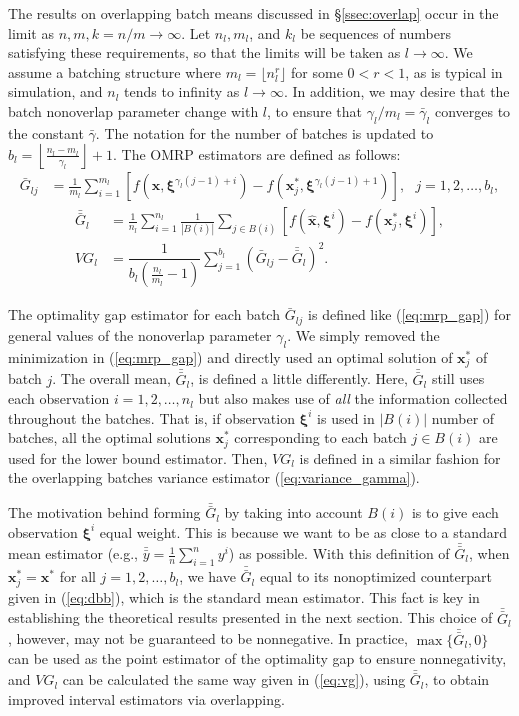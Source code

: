 \documentclass[12pt]{article}
\newcommand{\x}{\mathbf{x}}
\newcommand{\xh}{{\hat{\x}}}
\newcommand{\xs}{\x^*}
\newcommand{\xit}{\boldsymbol{\xi}}
\newcommand{\xiti}{\xit^i}
\newcommand{\nbl}{b_l}
\newcommand{\gammab}{\bar{\gamma}}
\newcommand{\gb}{\bar{G}}
\newcommand{\gbb}{\bar{\gb}}
\newcommand{\yb}{\bar{y}}
\newcommand{\ybb}{\bar{\yb}}
\begin{document}
The results on overlapping batch means discussed in \S \ref{ssec:overlap} occur in the limit as $n, m, k=n/m \rightarrow \infty$.  
Let $n_l, m_l$, and $k_l$ be sequences of numbers satisfying these requirements, so that the limits will be taken as $l \rightarrow \infty$.  
We assume a batching structure where $m_l = \lfloor n_l ^r \rfloor$ for some $0<r<1$, as is typical in simulation, and $n_l$ tends to infinity as $l \rightarrow \infty$.  
In addition, we may desire that the batch nonoverlap parameter change with $l$, to ensure that $\gamma_l / m_l = \gammab_l$ converges to the constant $\gammab$.  
The notation for the number of batches is updated to $b_l = \left\lfloor\tfrac{n_l-m_l}{\gamma_l}\right\rfloor+1$.
The OMRP estimators are defined as follows:
\begin{align}
	\gb_{lj} & = \frac{1}{m_l} \sum_{i=1}^{m_l} \left[ f(\xh,\xit^{\gamma_l(j-1)+i}) - f(\xs_j,\xit^{\gamma_l(j-1)+1}) \right],\ \ \ j = 1, 2, \dots, \nbl, \label{eq:gbar} 
\end{align}
\begin{align}
	\gbb_l & = \frac{1}{n_l} \sum_{i=1}^{n_l} \frac{1}{|B(i)|} \sum_{j \in B(i)} \left[ f(\xh,\xiti) - f(\xs_j,\xiti) \right], \label{eq:gbb} \\
	VG_l & = \dfrac{1}{ \nbl \left( \tfrac{n_l}{m_l} - 1 \right)} \sum_{j=1}^{\nbl} (\gb_{lj} - \gbb_l)^2. \label{eq:vg}
\end{align}

The optimality gap estimator for each batch $\gb_{lj}$ is defined like (\ref{eq:mrp_gap}) for general values of the nonoverlap parameter $\gamma_l$.  
We simply removed the minimization in (\ref{eq:mrp_gap}) and directly used an optimal solution of $\xs_j$ of batch $j$.  
The overall mean, $\gbb_l$, is defined a little differently.  
Here, $\gbb_l$ still uses each observation $i = 1, 2, \dots, n_l$ but also makes use of {\it all} the information collected throughout the batches.  
That is, if observation $\xiti$ is used in $|B(i)|$ number of batches, all the optimal solutions $\xs_j$ corresponding to each batch $j \in B(i)$ are used for the lower bound estimator.  
Then, $VG_l$ is defined in a similar fashion for the overlapping batches variance estimator (\ref{eq:variance_gamma}).

The motivation behind forming $\gbb_l$ by taking into account $B(i)$ is to give each observation $\xit^i$ equal weight. 
This is because we want to be as close to a standard mean estimator (e.g., $\ybb=\frac{1}{n}\sum_{i=1}^{n} y^i$) as possible.
With this definition of $\gbb_l$, when $\xs_j= \xs$ for all $j= 1, 2, \dots, \nbl$, we have $\gbb_l$ equal to its nonoptimized counterpart given in (\ref{eq:dbb}), which is the standard mean estimator. 
This fact is key in establishing the theoretical results presented in the next section. 
This choice of $\gbb_l$, however, may not be guaranteed to be nonnegative.
In practice, $\max\{\gbb_l,0\}$ can be used as the point estimator of the optimality gap to ensure nonnegativity, and $VG_l$ can be calculated the same way given in (\ref{eq:vg}), using $\gbb_l$, to obtain improved interval estimators via overlapping. 
\end{document}
